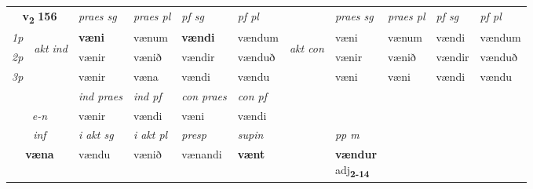 \noindent
\begin{tabular}{lllllllllll} \toprule
\multicolumn{2}{c}{\textbf{v{\textsubscript{2}}} \Large{\textbf{156}}}  &  \textit{praes sg}  & \textit{praes pl}  &\textit{ pf sg} & \textit{pf pl} &  &  \textit{praes sg}  & \textit{praes pl}  & \textit{pf sg} & \textit{pf pl } \\*
	\cmidrule{3-6} \cmidrule{8-11}
 {\textit{1p}} & \multirow{3}{*}{\begin{turn}{90}\textit{akt ind}\end{turn}} & \textbf{væni} & vænum & \textbf{vændi} & vændum & \multirow{3}{*}{\begin{turn}{90}\textit{akt con}\end{turn}} &væni & vænum & vændi & vændum\\*
 {\textit{2p}} &  &  vænir  & vænið & vændir & vænduð & & vænir & vænið & vændir & vænduð \\*
{\textit{3p}} &  & vænir & væna & vændi & vændu & & væni & væni& vændi & vændu \\*
\cmidrule{3-6} \cmidrule{8-11}

   & &  \textit{ind praes} & \textit{ind pf} & \textit{con praes} & \textit{con pf} \\*
\multicolumn{2}{c}{ \textit{e-n} } & vænir & vændi & væni & vændi \\*

\cmidrule{3-8}
   \multicolumn{2}{c}{\textit{inf}}  & \textit{i akt sg} & \textit{i akt pl}   & \textit{presp} & \textit{supin}  && \textit{pp m} \\*
  \multicolumn{2}{c}{\textbf{væna}} & vændu  & vænið   & vænandi &  \textbf{vænt}  && \specialcell{\textbf{vændur} \\ adj\textbf{\textsubscript{2-14}}} \\*
\end{tabular}

